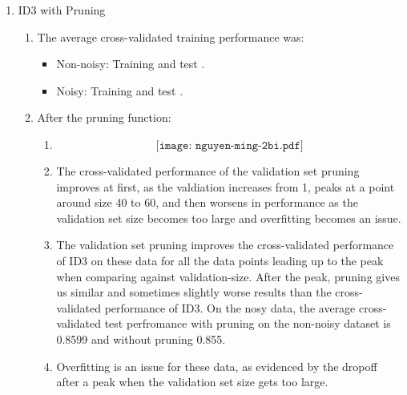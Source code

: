\documentclass[11pt]{article}
\begin{document}
\begin{enumerate}
\item ID3 with Pruning
\begin{enumerate}
\item The average cross-validated training performance was:
	\begin{itemize}
	\item Non-noisy: Training  and test .
	\item Noisy: Training  and test .
	\end{itemize}
\item After the pruning function:
	\begin{enumerate}
	\item $$\texttt{[image: nguyen-ming-2bi.pdf]}$$
	\item The cross-validated performance of the validation set pruning improves at first, as the valdiation increases from 1, peaks at a point around size 40 to 60, and then worsens in performance as the validation set size becomes too large and overfitting becomes an issue.
	\item The validation set pruning improves the cross-validated performance of ID3 on these data for all the data points leading up to the peak when comparing against validation-size. After the peak, pruning gives us similar and sometimes slightly worse results than the cross-validated performance of ID3. On the nosy data, the average cross-validated test perfromance with pruning on the non-noisy dataset is 0.8599 and without pruning 0.855.
	\item Overfitting is an issue for these data, as evidenced by the dropoff after a peak when the validation set size gets too large.
	\end{enumerate}
\end{enumerate}


\end{enumerate}
\end{document}
